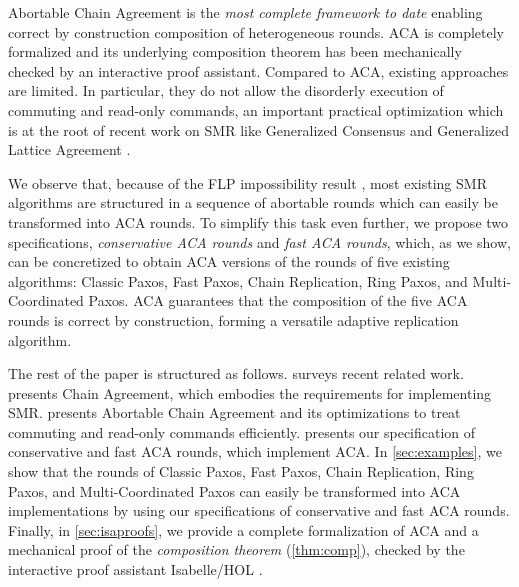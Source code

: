 Abortable Chain Agreement is the \emph{most complete framework to date} enabling
correct by construction composition of heterogeneous rounds.  
ACA is completely formalized and its underlying composition theorem has been
mechanically checked by an interactive proof assistant.  
Compared to ACA,
existing approaches
\cite{BarNoyETAL87ShiftingGearsChangingAlgorithmsFlyTo,GuerraouiETAL10Next700BftProtocols,GuerraouiKuncakLosa12SpeculativeLinearizability}
are limited. In particular, they do not allow the disorderly execution of
commuting and read-only commands, an important practical optimization
which is at the root of recent work on SMR like Generalized Consensus
\cite{Lamport05GeneralizeConsensus} and Generalized Lattice Agreement
\cite{FalerioETAL12GeneralizedLatticeAgreement}.

\begin{comment}
On top of the traditional roles of proposer, acceptor, and learners
\cite{lamport2001paxos} used in consensus algorithms, ACA introduces
the notion of \emph{switchers} and of \emph{scheduling policy}. The switchers
have the task of aborting a running ACA round and initializing a new
ACA round in a safe and live manner.  The \emph{scheduling policy}
decides when to abort an ACA round and choses the next ACA round to
execute. It must ensure that all switchers agree on the next ACA round
to initialize.
\end{comment}

We observe that, because of the FLP impossibility result
\cite{FischerLynchPaterson83ImpossibilityDistributedConsensusOneFaultyProcess},
most existing SMR algorithms are structured in a sequence of abortable
rounds which can easily be transformed into ACA rounds. To simplify
this task even further, we propose two specifications, \emph{conservative
ACA rounds} and \emph{fast ACA rounds}, which, as we show, can be concretized
to obtain ACA versions of the rounds of five existing algorithms: 
Classic Paxos, Fast Paxos, Chain Replication, Ring Paxos,
and Multi-Coordinated Paxos. ACA guarantees that the composition of the five ACA
rounds is correct by construction, forming a versatile adaptive replication
algorithm. 

The rest of the paper is structured as follows.
 surveys recent related work.  presents Chain
Agreement, which embodies the requirements for implementing SMR. 
presents Abortable Chain Agreement and its optimizations to treat commuting
and read-only commands efficiently.  presents our specification
of conservative and fast ACA rounds, which implement ACA. In
\cref{sec:examples}, we show that the rounds of  
Classic Paxos, Fast Paxos, Chain Replication, Ring Paxos,
and Multi-Coordinated Paxos can easily be transformed into ACA implementations
by using our specifications of conservative and fast ACA rounds.
Finally, in \cref{sec:isaproofs}, we provide a complete formalization of ACA
and a mechanical proof of the \emph{composition theorem} (\cref{thm:comp}),
checked by the interactive proof assistant Isabelle/HOL \cite{NipkowPaulsonWenzel02IsabelleHOL}. 

